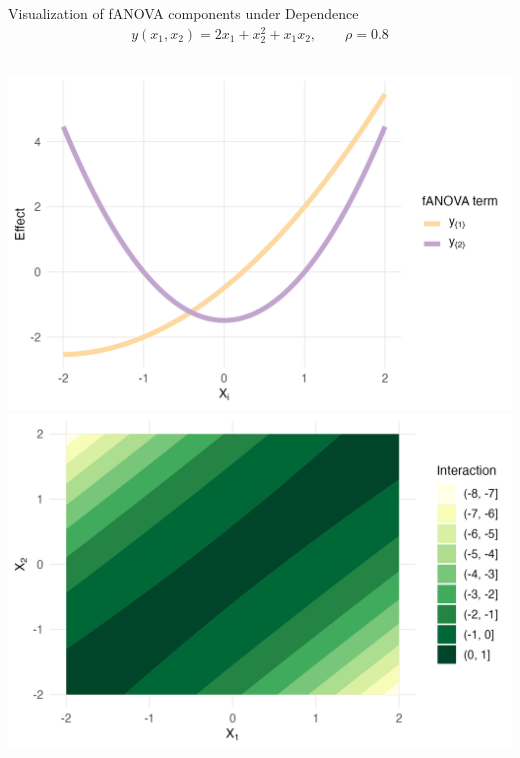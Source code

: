 \begin{frame}{Visualization of fANOVA components under Dependence} %
  \begin{align*}
    y(x_1, x_2) = 2x_1 + x_2^{2} + x_1 x_2, \qquad \rho = 0.8
  \end{align*}
  \begin{columns}
      \includegraphics[width=\linewidth]{../images/experiment_section/gen_ex_1_a1p20_a2p00_a11p00_a22p10_a12p10_rhop08_main.png}
      \includegraphics[width=\linewidth]{../images/experiment_section/gen_ex_1_a1p20_a2p00_a11p00_a22p10_a12p10_rhop08_interaction.png}
  \end{columns}
\end{frame}

